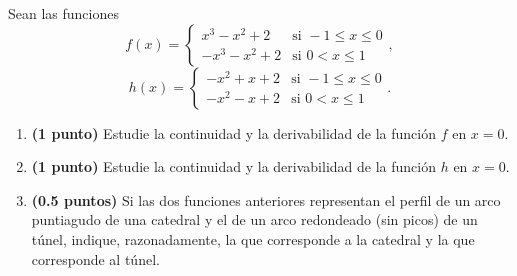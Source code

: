 
Sean las funciones
\[
f(x)=\begin{cases}x^3-x^2+2&\text{si }-1\leq x\leq0\\-x^3-x^2+2&\text{si }0<x\leq1\end{cases},
\]
\[
h(x)=\begin{cases}-x^2+x+2&\text{si }-1\leq x\leq0\\-x^2-x+2&\text{si }0<x\leq1\end{cases}.
\]
\begin{enumerate}[label=\alph*)]
\item \textbf{(1 punto)} Estudie la continuidad y la derivabilidad de la función $f$ en $x=0$.
\item \textbf{(1 punto)} Estudie la continuidad y la derivabilidad de la función $h$ en $x=0$.
\item \textbf{(0.5 puntos)} Si las dos funciones anteriores representan el perfil de un arco puntiagudo de una catedral y el de un arco redondeado (sin picos) de un túnel, indique, razonadamente, la que corresponde a la catedral y la que corresponde al túnel.
\end{enumerate}
